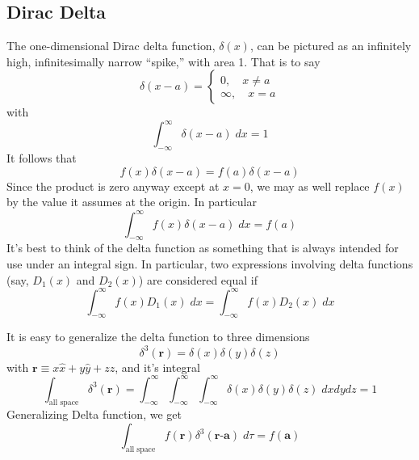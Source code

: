 \documentclass[../main.tex]{subfiles}
\begin{document}
\subsection*{Dirac Delta}
The one-dimensional Dirac delta function, $\delta(x)$, can be pictured as an infinitely high, infinitesimally narrow “spike,” with area 1. That is to say
\begin{equation*}
    \delta (x-a)=\begin{cases}
        0,\quad  x\neq a\\
        \infty,\quad  x=a
    \end{cases}
\end{equation*}
with
\begin{equation*}
    \int_{-\infty}^{\infty} \delta (x-a)\;dx =1
\end{equation*}
It follows that
\begin{equation*}
    f(x)\delta(x-a)=f(a)\delta(x-a)
\end{equation*}
Since the product is zero anyway except at $x = 0$, we may as well replace $f (x)$ by the value it assumes at the origin. In particular
\begin{equation*}
    \int_{-\infty}^{\infty}f(x)\delta(x-a)\;dx=f(a)
\end{equation*}
It's best to think of the delta function as something that is always intended for use under an integral sign. In particular, two expressions involving delta functions (say, $D_1(x)$ and $D_2(x)$) are considered equal if
\begin{equation*}
    \int_{-\infty}^{\infty}f(x)D_1(x)\;dx=\int_{-\infty}^{\infty}f(x)D_2(x)\;dx
\end{equation*}

It is easy to generalize the delta function to three dimensions
\begin{equation*}
    \delta^3(\textbf{r})=\delta (x)\delta (y)\delta(z)
\end{equation*}
with $\textbf{r} \equiv x \hat{x} + y\hat{y}+ z \hat{z}$, and it's integral
\begin{equation*}
    \int_{\text{all space}}\delta^3({\textbf{r}})=\int_{-\infty}^{\infty}\int_{-\infty}^{\infty}\int_{-\infty}^{\infty}\delta(x)\delta(y)\delta(z)\;dxdydz=1
\end{equation*}
Generalizing Delta function, we get
\begin{equation*}
    \int_{\text{all space}}f(\textbf{r})\delta^3({\textbf{r-a}})\;d\tau=f(\textbf{a})
\end{equation*}
\end{document}
